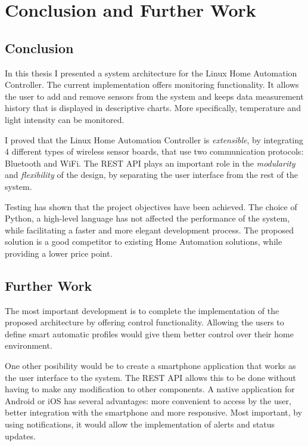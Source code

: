 \chapter{Conclusion and Further Work}

\section{Conclusion}

In this thesis I presented a system architecture for the Linux Home Automation Controller. The current implementation offers monitoring functionality. It allows the user to add and remove sensors from the system and keeps data measurement history that is displayed in descriptive charts. More specifically, temperature and light intensity can be monitored. 

I proved that the Linux Home Automation Controller is \textit{extensible}, by integrating 4 different types of wireless sensor boards, that use two communication protocols: Bluetooth and WiFi. The REST API plays an important role in the \textit{modularity} and \textit{flexibility} of the design, by separating the user interface from the rest of the system. 

Testing has shown that the project objectives have been achieved. The choice of Python, a high-level language has not affected the performance of the system, while facilitating a faster and more elegant development process. The proposed solution is a good competitor to existing Home Automation solutions, while providing a lower price point.

\section{Further Work}

The most important development is to complete the implementation of the proposed architecture by offering control functionality. Allowing the users to define smart automatic profiles would give them better control over their home environment.

One other posibility would be to create a smartphone application that works as the user interface to the system. The REST API allows this to be done without having to make any modification to other components. A native application for Android or iOS has several advantages: more convenient to access by the user, better integration with the smartphone and more responsive. Most important, by using notifications, it would allow the implementation of alerts and status updates.
